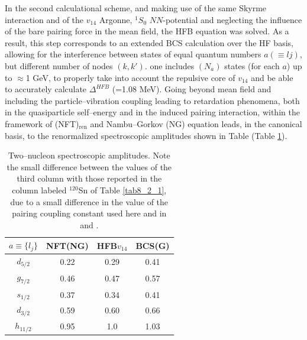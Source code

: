 In the second calculational scheme, and making use of the same Skyrme interaction and of the $v_{14}$ Argonne, $^1S_0$ $NN$-potential and neglecting the influence of the bare
pairing force in the mean field,
the HFB equation was solved. As a result, this step corresponds to an extended BCS calculation over the HF basis, allowing for the 
interference between states of equal quantum numbers $a (\equiv lj)$, but different number of nodes $(k,k')$. one includes $(N_a)$ states
(for each $a$) up to $\approx $1 GeV, to properly take into account  the repulsive core of $v_{14}$ and be able to accurately calculate 
$\Delta^{HFB}$ (=1.08 MeV). Going beyond mean field and including the particle--vibration coupling leading to retardation phenomena, both in the quasiparticle self--energy and in the  induced pairing interaction, within the framework of (NFT)$_{\text{ren}}$ and Nambu--Gorkov (NG) equation leads, in the canonical basis, to the renormalized spectroscopic amplitudes shown in Table (Table \ref{tab6.4.3}).

\begin{table}
\begin{center}
\begin{tabular}{|c|c|c|c|}
\hline
$a\equiv\{l_j\}$ & NFT(NG)  & HFB$v_{14}$  & BCS(G)  \\ 
 \hline 
$d_{5/2}$ & 0.22 & 0.29 & 0.41 \\ 
\hline 
$g_{7/2}$ & 0.46 & 0.47 &  0.57\\ 
 \hline
$s_{1/2}$ & 0.37 & 0.34 & 0.41 \\ 
 \hline
$d_{3/2}$ & 0.59 & 0.60 & 0.66 \\ 
 \hline
$h_{11/2}$ & 0.95 & 1.0 & 1.03\\
 \hline
\end{tabular}
\end{center}
\caption{Two--nucleon spectroscopic amplitudes. Note the small difference between the values of the third column with those reported in the column labeled $^{120}$Sn of Table \ref{tab8_2_1}, due to a small difference in the value of the pairing coupling constant used here and in \cite{Potel:13b} and \cite{Potel:17}.}\label{tab6.4.3}
\end{table} 


